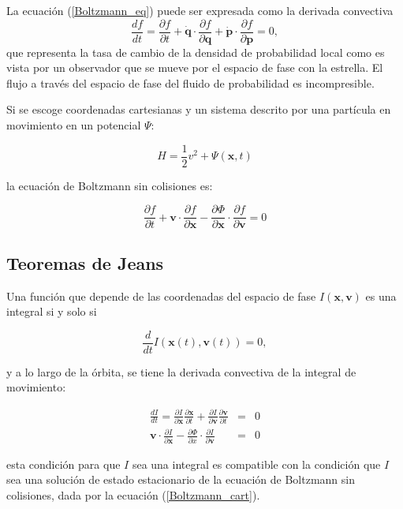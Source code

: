 La ecuación (\ref{Boltzmann_eq}) puede ser expresada como la derivada convectiva
$$ \frac{d f}{ d t} = \frac{\partial f}{\partial t} + \dot{\textbf{q}} \cdot \frac{\partial f }{\partial \textbf{q}} + \dot{\textbf{p}} \cdot \frac{\partial f }{\partial \textbf{p}} = 0, $$
que representa la tasa de cambio de la densidad de probabilidad local como es vista por un observador que se mueve por el espacio de fase con la estrella. El flujo a través del espacio de fase del fluido de probabilidad es incompresible.

Si se escoge coordenadas  cartesianas y un sistema descrito por una partícula en movimiento en un potencial $\Psi$:

\begin{equation}
\label{Hamiltonian_potential}
H = \frac{1}{2} v^2 + \Psi(\textbf{x}, t)
\end{equation}

la ecuación de Boltzmann sin colisiones es:

\begin{equation}
\label{Boltzmann_cart}
\frac{\partial f}{\partial t} + \textbf{v}\cdot \frac{\partial f}{\partial \textbf{x}} - \frac{\partial \Phi}{\partial \textbf{x}} \cdot \frac{\partial f}{\partial \textbf{v}} = 0
\end{equation}



\subsection{Teoremas de Jeans}

Una función que depende de las coordenadas del espacio de fase $I(\bm{x}, \bm{v})$ es una integral si y solo si

$$ \frac{d}{dt} I(\bm{x}(t), \bm{v}(t)) = 0, $$

y a lo largo de la órbita, se tiene la derivada convectiva de la integral de movimiento:

\begin{eqnarray}
\frac{d I}{dt} = \frac{\partial I}{\partial \bm{x}}  \frac{\partial \bm{x} }{\partial t } + \frac{\partial I}{\partial \bm{v}}  \frac{\partial \bm{v} }{\partial t } &=& 0 \\
\bm{v} \cdot \frac{\partial I}{\partial \bm{x}}   - \frac{\partial \Phi }{\partial x } \cdot  \frac{\partial I}{\partial \bm{v}}   &=& 0
\end{eqnarray}

esta condición para que $I$ sea una integral es compatible con la condición que $I$ sea una solución de estado estacionario de la ecuación de Boltzmann sin colisiones, dada por la ecuación (\ref{Boltzmann_cart}). \cite{BT08}

